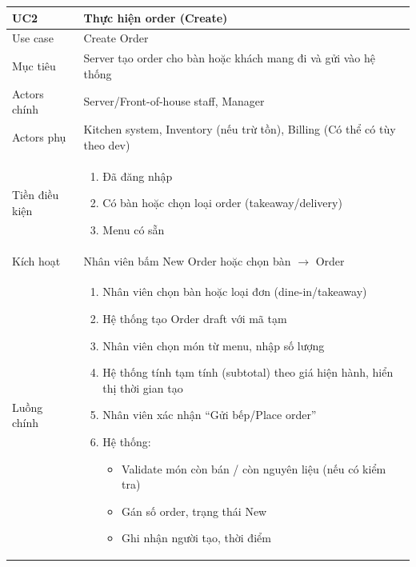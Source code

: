 \begin{longtable}{|>{\raggedright\arraybackslash}p{}|>{\raggedright\arraybackslash}p{}|}
\hline
\textbf{UC2} & \textbf{Thực hiện order (Create)} \\
\hline
Use case & Create Order \\
\hline
Mục tiêu & Server tạo order cho bàn hoặc khách mang đi và gửi vào hệ thống \\
\hline
Actors chính & Server/Front-of-house staff, Manager \\
\hline
Actors phụ & Kitchen system, Inventory (nếu trừ tồn), Billing (Có thể có tùy theo dev) \\
\hline
Tiền điều kiện &
\vspace{-0.5em}
\begin{enumerate}[leftmargin=*]
\item Đã đăng nhập
\item Có bàn hoặc chọn loại order (takeaway/delivery)
\item Menu có sẵn
\end{enumerate}
\vspace{-0.5em}
\\
\hline
Kích hoạt & Nhân viên bấm New Order hoặc chọn bàn $\rightarrow$ Order \\
\hline
Luồng chính &
\vspace{-0.5em}
\begin{enumerate}[leftmargin=*]
\item Nhân viên chọn bàn hoặc loại đơn (dine-in/takeaway)
\item Hệ thống tạo Order draft với mã tạm
\item Nhân viên chọn món từ menu, nhập số lượng
\item Hệ thống tính tạm tính (subtotal) theo giá hiện hành, hiển thị thời gian tạo
\item Nhân viên xác nhận “Gửi bếp/Place order”
\item Hệ thống:
\vspace{-0.5em}
\begin{itemize}[leftmargin=*]
\item Validate món còn bán / còn nguyên liệu (nếu có kiểm tra)
\item Gán số order, trạng thái New
\item Ghi nhận người tạo, thời điểm
\end{itemize}
\vspace{-0.5em}

\end{enumerate}
\end{longtable}
